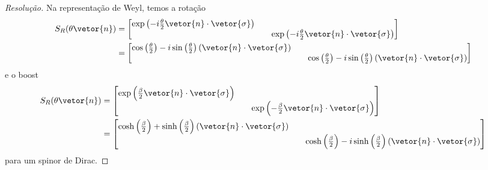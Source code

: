 \begin{proof}[Resolução]
    Na representação de Weyl, temos a rotação 
    \begin{align*}
        S_R(\theta\vetor{n}) 
        &= \begin{bmatrix}
            \exp\left(-i\frac{\theta}{2}\vetor{n}\cdot\vetor{\sigma}\right) && \\
                                                                            &&\exp\left(-i\frac{\theta}{2}\vetor{n}\cdot\vetor{\sigma}\right)
        \end{bmatrix}\\
        &= \begin{bmatrix}
            \cos\left(\frac\theta2\right) - i \sin\left(\frac\theta2\right) (\vetor{n}\cdot\vetor{\sigma})&&\\
                                                                                                                      &&\cos\left(\frac\theta2\right) - i \sin\left(\frac\theta2\right) (\vetor{n}\cdot\vetor{\sigma})
        \end{bmatrix}
    \end{align*}
    e o boost
    \begin{align*}
        S_R(\theta\vetor{n})
        &= \begin{bmatrix}
            \exp\left(\frac{\beta}{2}\vetor{n}\cdot\vetor{\sigma}\right) && \\
                                                                            &&\exp\left(-\frac{\beta}{2}\vetor{n}\cdot\vetor{\sigma}\right)
        \end{bmatrix}\\
        &= \begin{bmatrix}
            \cosh\left(\frac\beta2\right) +\sinh\left(\frac\beta2\right) (\vetor{n}\cdot\vetor{\sigma})&&\\
                                                                                                                      &&\cosh\left(\frac\beta2\right) - i \sinh\left(\frac\beta2\right) (\vetor{n}\cdot\vetor{\sigma})
        \end{bmatrix}
    \end{align*}
    para um spinor de Dirac.
\end{proof}
